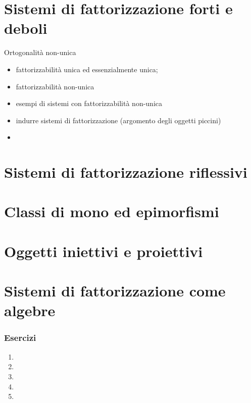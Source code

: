 \section[Fattorizzazione]{Sistemi di fattorizzazione forti e deboli}
Ortogonalità non-unica
\begin{itemize}
	\item fattorizzabilità unica ed essenzialmente unica;
	\item fattorizzabilità non-unica
	\item esempi di sistemi con fattorizzabilità non-unica
	\item indurre sistemi di fattorizzazione (argomento degli oggetti piccini)
	\item
\end{itemize}
\section[Riflessività]{Sistemi di fattorizzazione riflessivi}
\section[Mono ed epimorfismi]{Classi di mono ed epimorfismi}
\section[Iniettivi e proiettivi]{Oggetti iniettivi e proiettivi}
\section[Fattorizzazione e algebre]{Sistemi di fattorizzazione come algebre}
\subsubsection*{Esercizi}
\begin{enumerate}
	\item
	\item
	\item
	\item
	\item
\end{enumerate}
